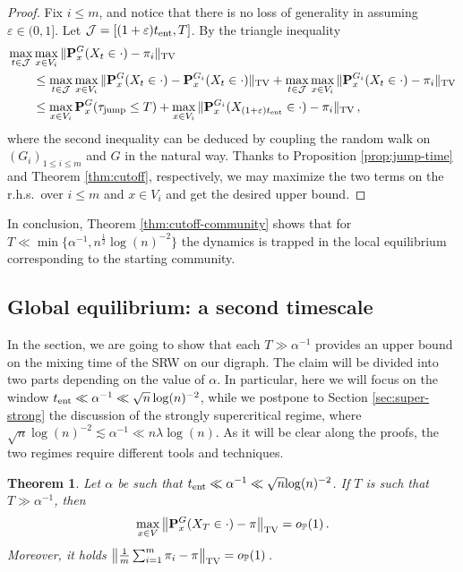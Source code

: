\documentclass[11pt,oneside]{amsart}
\numberwithin{equation}{section}  %
\theoremstyle{plain}
\newtheorem{theorem}{Theorem}
\newcommand{\rhs}{{r.h.s.~}}
\newcommand{\p}{\mathbb{P}}
\newcommand{\op}{o_{\p}}
\newcommand{\tent}{t_{\textup{ent}}}
\newcommand{\quenchG}{\mathbf{P}^G}
\newcommand{\quench}{\mathbf{P}}
\newcommand{\tauj}{\tau_{\textup{jump}}}
\begin{document}
\begin{proof}
	Fix $i \le m$, and notice that there is no loss of generality in assuming $\varepsilon\in(0,1]$. Let $\mathcal{J}=[(1+\varepsilon)\tent,T]$. By the triangle inequality
	\begin{equation} \begin{split}
		\max_{t\in\mathcal{J}}&\max_{x\in V_i}\|\quenchG_x(X_{t} \in \cdot)- \pi_i\|_{\rm TV}\\
		&\le	\max_{t\in\mathcal{J}}\max_{x\in V_i}\|\quenchG_x(X_{t} \in \cdot)- \quench^{G_i}_x(X_{t} \in \cdot)\|_{\rm TV}+\max_{t\in\mathcal{J}}\max_{x\in V_i}\|\quench^{G_i}_x(X_{t} \in \cdot)-\pi_i\|_{\rm TV}\\
		&\le \max_{x\in V_i}\quenchG_x(\tauj\le T)+	\max_{x\in V_i}\|\quench^{G_i}_x(X_{(1+\varepsilon)\tent} \in \cdot)-\pi_i\|_{\rm TV}\,,
	\end{split}
	\end{equation}
	where the second inequality can be deduced by coupling the random walk on $(G_i)_{1\le i \le m}$ and $G$ in the natural way.
	Thanks to Proposition \ref{prop:jump-time} and Theorem \ref{thm:cutoff}, respectively, we may maximize the two terms on the \rhs over $i \le m$ and $x \in V_i$ and get the desired upper bound.
\end{proof}
 In conclusion, Theorem \ref{thm:cutoff-community} shows that for $T \ll \min\{\alpha^{-1},  {n}^{ \frac12 }{\log(n)^{-2}} \}$ the dynamics is trapped in the local equilibrium corresponding to the starting community. 
\subsection{Global equilibrium: a second timescale}\label{suse:global-weak}
In the section, we are going to show that each $T\gg\alpha^{-1}$
provides an upper bound on the mixing time of the SRW on our digraph. 
The claim will be divided into two parts
depending on the value of $\alpha$. In particular, here we will focus on the window $\tent\ll\alpha^{-1}\ll \sqrt{n}\log(n)^{-2}$,
while we postpone to Section \ref{sec:super-strong} the discussion of the strongly supercritical regime, where $\sqrt{n}\log(n)^{-2}\lesssim\alpha^{-1}\ll n\lambda \log(n) $.
As it will be clear along the proofs, the two regimes require different tools and techniques. 


	\begin{theorem} \label{thm:pi-approximation}
		Let $\alpha$ be such that $\tent\ll \alpha^{-1}\ll\sqrt{n}{\log(n)^{-2}} $. If $T$ is such that $T \gg \alpha^{-1}$, then
		\begin{equation}
		\max_{x\in V}\left\|\quenchG_x(X_{T}\in\cdot)-\pi\right\|_{\rm TV}=\op(1)\,.
			\end{equation}
		Moreover, it holds $\left\|\frac1m\sum_{i=1}^m{\pi_i}-\pi\right\|_{\rm TV}=\op(1)\,$.
	\end{theorem}
	
\end{document}
